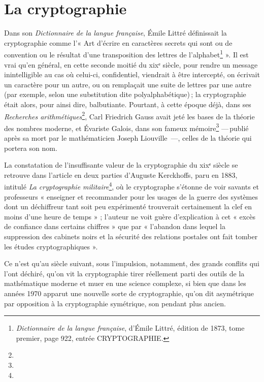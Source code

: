 
\section{La cryptographie} %
\label{sec:cryptographie}


Dans son \emph{Dictionnaire de la langue française}, Émile Littré définissait la cryptographie comme
l’« Art d'écrire en caractères secrets qui sont ou de convention ou le résultat d'une transposition
des lettres de l'alphabet\footnote{\emph{Dictionnaire de la langue française}, d’Émile Littré,
édition de 1873, tome premier, page 922, entrée CRYPTOGRAPHIE.} ».
Il est vrai qu’en général, en cette seconde moitié  du {\sc xix}ᵉ siècle, pour rendre un message
inintelligible au cas où celui-ci, confidentiel, viendrait à être intercepté, on écrivait un
caractère pour un autre, ou on remplaçait une suite de lettres par une autre (par exemple, selon une
substitution dite polyalphabétique) ; la cryptographie était alors, pour ainsi dire, balbutiante.
Pourtant, à cette époque déjà, dans ses \emph{Recherches arithmétiques}\footnote{}, Carl Friedrich
Gauss avait jeté les bases de la théorie des nombres moderne, et Évariste Galois, dans son fameux
mémoire\footnote{} --- publié après sa mort par le mathématicien Joseph Liouville ---, celles de la
théorie qui portera son nom.

La constatation de l’insuffisante valeur de la cryptographie du {\sc xix}ᵉ siècle se retrouve dans
l’article en deux parties d’Auguste Kerckhoffs, paru en 1883, intitulé \emph{La cryptographie
militaire}\footnote{}, où le cryptographe s’étonne de voir savants et professeurs « enseigner et
recommander pour les usages de la guerre des systèmes dont un déchiffreur tant soit peu expérimenté
trouverait certainement la clef en moins d’une heure de temps » ; l’auteur ne voit guère
d’explication à cet « excès de confiance dans certains chiffres » que par « l’abandon dans lequel la
suppression des cabinets noirs et la sécurité des relations postales ont fait tomber les études
cryptographiques ».

Ce n’est qu’au siècle suivant, sous l’impulsion, notamment, des grands conflits qui l’ont déchiré,
qu’on vit la cryptographie tirer réellement parti des outils de la mathématique moderne et muer en
une science complexe, si bien que dans les années 1970 apparut une nouvelle sorte de cryptographie,
qu’on dit asymétrique par opposition à la cryptographie symétrique, son pendant plus ancien.

